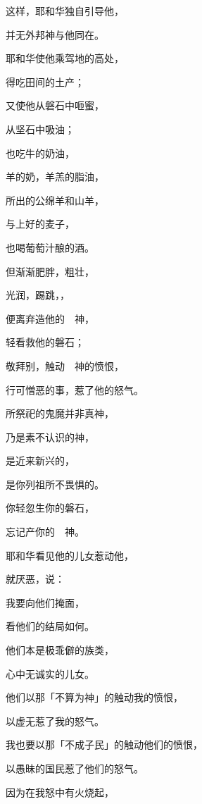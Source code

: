 {\par }{\Q {}这样，耶和华独自引导他，
\par }{\Q 并无外邦神与他同在。
\par }{\Q {}耶和华使他乘驾地的高处，
\par }{\Q 得吃田间的土产；
\par }{\Q 又使他从磐石中咂蜜，
\par }{\Q 从坚石中吸油；
\par }{\Q {}也吃牛的奶油，
\par }{\Q 羊的奶，羊羔的脂油，
\par }{所出的公绵羊和山羊，
\par }{\Q 与上好的麦子，
\par }{\Q 也喝葡萄汁酿的酒。
\par }{\BB \par }{\Q {}但{}渐渐肥胖，粗壮，
\par }{\Q 光润，踢跳，{}，
\par }{\Q 便离弃造他的　神，
\par }{\Q 轻看救他的磐石；
\par }{\Q {}敬拜别{}，触动　神的愤恨，
\par }{\Q 行可憎恶的事，惹了他的怒气。
\par }{\Q {}所祭祀的鬼魔并非真神，
\par }{\Q 乃是素不认识的神，
\par }{\Q 是近来新兴的，
\par }{\Q 是你列祖所不畏惧的。
\par }{\Q {}你轻忽生你的磐石，
\par }{\Q 忘记产你的　神。
\par }{\BB \par }{\Q {}耶和华看见他的儿女惹动他，
\par }{\Q 就厌恶{}，说：
\par }{\Q {}我要向他们掩面，
\par }{\Q 看他们的结局如何。
\par }{\Q 他们本是极乖僻的族类，
\par }{\Q 心中无诚实的儿女。
\par }{\Q {}他们以那「不算为神」的触动我的愤恨，
\par }{\Q 以虚无{}惹了我的怒气。
\par }{\Q 我也要以那「不成子民」的触动他们的愤恨，
\par }{\Q 以愚昧的国民惹了他们的怒气。
\par }{\Q {}因为在我怒中有火烧起，
}
